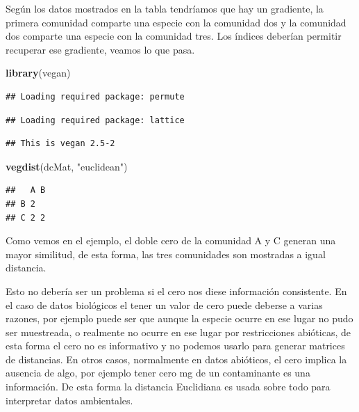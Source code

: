 \documentclass[]{book}
\newenvironment{Shaded}{\begin{snugshade}}{\end{snugshade}}
\newcommand{\KeywordTok}[1]{\textcolor[rgb]{0.13,0.29,0.53}{\textbf{{#1}}}}
\newcommand{\StringTok}[1]{\textcolor[rgb]{0.31,0.60,0.02}{{#1}}}
\newcommand{\NormalTok}[1]{{#1}}
\begin{document}
Según los datos mostrados en la tabla tendríamos que hay un gradiente,
la primera comunidad comparte una especie con la comunidad dos y la
comunidad dos comparte una especie con la comunidad tres. Los índices
deberían permitir recuperar ese gradiente, veamos lo que pasa.

\begin{Shaded}
\begin{Highlighting}[]
\KeywordTok{library}\NormalTok{(vegan)}
\end{Highlighting}
\end{Shaded}

\begin{verbatim}
## Loading required package: permute
\end{verbatim}

\begin{verbatim}
## Loading required package: lattice
\end{verbatim}

\begin{verbatim}
## This is vegan 2.5-2
\end{verbatim}

\begin{Shaded}
\begin{Highlighting}[]
\KeywordTok{vegdist}\NormalTok{(dcMat, }\StringTok{"euclidean"}\NormalTok{)}
\end{Highlighting}
\end{Shaded}

\begin{verbatim}
##   A B
## B 2  
## C 2 2
\end{verbatim}

Como vemos en el ejemplo, el doble cero de la comunidad A y C generan
una mayor similitud, de esta forma, las tres comunidades son mostradas a
igual distancia.

Esto no debería ser un problema si el cero nos diese información
consistente. En el caso de datos biológicos el tener un valor de cero
puede deberse a varias razones, por ejemplo puede ser que aunque la
especie ocurre en ese lugar no pudo ser muestreada, o realmente no
ocurre en ese lugar por restricciones abióticas, de esta forma el cero
no es informativo y no podemos usarlo para generar matrices de
distancias. En otros casos, normalmente en datos abióticos, el cero
implica la ausencia de algo, por ejemplo tener cero mg de un
contaminante es una información. De esta forma la distancia Euclidiana
es usada sobre todo para interpretar datos ambientales.
\end{document}
